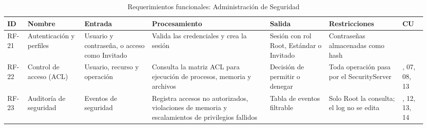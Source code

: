 \documentclass[conference]{IEEEtran}
\begin{document}
\begin{table}[!t]
\caption{Requerimientos funcionales: Administración de Seguridad}
\label{tab:rf-seguridad}
\footnotesize\renewcommand{\arraystretch}{1.1}\setlength{\tabcolsep}{2pt}
\begin{tabular}{|>{\raggedright\arraybackslash}p{0.95cm}|>{\raggedright\arraybackslash}p{2.3cm}|>{\raggedright\arraybackslash}p{3.2cm}|>{\raggedright\arraybackslash}p{3.9cm}|>{\raggedright\arraybackslash}p{2.8cm}|>{\raggedright\arraybackslash}p{2.8cm}|>{\raggedright\arraybackslash}p{0.95cm}|}
\hline
\textbf{ID} & \textbf{Nombre} & \textbf{Entrada} & \textbf{Procesamiento} & \textbf{Salida} & \textbf{Restricciones} & \textbf{CU}\\ \hline
RF-21 & Autenticación y perfiles & Usuario y contraseña, o acceso como Invitado & Valida las credenciales y crea la sesión & Sesión con rol Root, Estándar o Invitado & Contraseñas almacenadas como hash & 12\\ \hline
RF-22 & Control de acceso (ACL) & Usuario, recurso y operación & Consulta la matriz ACL para ejecución de procesos, memoria y archivos & Decisión de permitir o denegar & Toda operación pasa por el SecurityServer & 01, 07, 08, 13\\ \hline
RF-23 & Auditoría de seguridad & Eventos de seguridad & Registra accesos no autorizados, violaciones de memoria y escalamientos de privilegios fallidos & Tabla de eventos filtrable & Solo Root la consulta; el log no se edita & 10, 12, 13, 14\\ \hline
\end{tabular}
\end{table}
\end{document}
